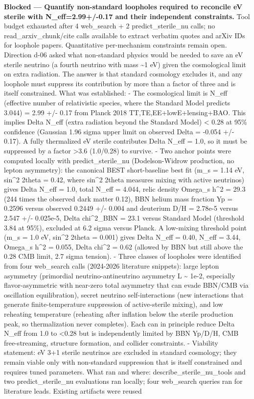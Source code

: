 \documentclass[11pt,a4paper]{article}
\begin{document}
\textbf{Blocked --- Quantify non-standard loopholes required to reconcile eV sterile with N\_eff=2.99+/-0.17 and their independent constraints.} Tool budget exhausted after 4 web\_search + 2 predict\_sterile\_nu calls; no read\_arxiv\_chunk/cite calls available to extract verbatim quotes and arXiv IDs for loophole papers. Quantitative per-mechanism constraints remain open. Direction d-06 asked what non-standard physics would be needed to save an eV sterile neutrino (a fourth neutrino with mass \textasciitilde{}1 eV) given the cosmological limit on extra radiation. The answer is that standard cosmology excludes it, and any loophole must suppress its contribution by more than a factor of three and is itself constrained. What was established: - The cosmological limit is N\_eff (effective number of relativistic species, where the Standard Model predicts 3.044) = 2.99 +/- 0.17 from Planck 2018 TT,TE,EE+lowE+lensing+BAO. This implies Delta N\_eff (extra radiation beyond the Standard Model) \textless{} 0.28 at 95\% confidence (Gaussian 1.96 sigma upper limit on observed Delta = -0.054 +/- 0.17). A fully thermalized eV sterile contributes Delta N\_eff = 1.0, so it must be suppressed by a factor \textgreater{}3.6 (1.0/0.28) to survive. - Two anchor points were computed locally with predict\_sterile\_nu (Dodelson-Widrow production, no lepton asymmetry): the canonical BEST short-baseline best fit (m\_s = 1.14 eV, sin\textasciicircum{}2 2theta = 0.42, where sin\textasciicircum{}2 2theta measures mixing with active neutrinos) gives Delta N\_eff = 1.0, total N\_eff = 4.044, relic density Omega\_s h\textasciicircum{}2 = 29.3 (244 times the observed dark matter 0.12), BBN helium mass fraction Yp = 0.2596 versus observed 0.2449 +/- 0.004 and deuterium D/H = 2.78e-5 versus 2.547 +/- 0.025e-5, Delta chi\textasciicircum{}2\_BBN = 23.1 versus Standard Model (threshold 3.84 at 95\%), excluded at 6.2 sigma versus Planck. A low-mixing threshold point (m\_s = 1.0 eV, sin\textasciicircum{}2 2theta = 0.001) gives Delta N\_eff = 0.40, N\_eff = 3.44, Omega\_s h\textasciicircum{}2 = 0.055, Delta chi\textasciicircum{}2 = 0.62 (allowed by BBN but still above the 0.28 CMB limit, 2.7 sigma tension). - Three classes of loopholes were identified from four web\_search calls (2024-2026 literature snippets): large lepton asymmetry (primordial neutrino-antineutrino asymmetry L \textasciitilde{} 1e-2, especially flavor-asymmetric with near-zero total asymmetry that can evade BBN/CMB via oscillation equilibration), secret neutrino self-interactions (new interactions that generate finite-temperature suppression of active-sterile mixing), and low reheating temperature (reheating after inflation below the sterile production peak, so thermalization never completes). Each can in principle reduce Delta N\_eff from 1.0 to \textless{}0.28 but is independently limited by BBN Yp/D/H, CMB free-streaming, structure formation, and collider constraints. - Viability statement: eV 3+1 sterile neutrinos are excluded in standard cosmology; they remain viable only with non-standard suppression that is itself constrained and requires tuned parameters. What ran and where: describe\_sterile\_nu\_tools and two predict\_sterile\_nu evaluations ran locally; four web\_search queries ran for literature leads. Existing artifacts were reused 
\end{document}
